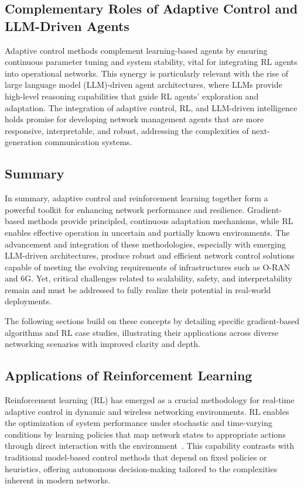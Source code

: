 \documentclass[sigconf]{acmart}
\begin{document}
\subsection{Complementary Roles of Adaptive Control and LLM-Driven Agents}

Adaptive control methods complement learning-based agents by ensuring continuous parameter tuning and system stability, vital for integrating RL agents into operational networks. This synergy is particularly relevant with the rise of large language model (LLM)-driven agent architectures, where LLMs provide high-level reasoning capabilities that guide RL agents’ exploration and adaptation. The integration of adaptive control, RL, and LLM-driven intelligence holds promise for developing network management agents that are more responsive, interpretable, and robust, addressing the complexities of next-generation communication systems.

\subsection{Summary}

In summary, adaptive control and reinforcement learning together form a powerful toolkit for enhancing network performance and resilience. Gradient-based methods provide principled, continuous adaptation mechanisms, while RL enables effective operation in uncertain and partially known environments. The advancement and integration of these methodologies, especially with emerging LLM-driven architectures, produce robust and efficient network control solutions capable of meeting the evolving requirements of infrastructures such as O-RAN and 6G. Yet, critical challenges related to scalability, safety, and interpretability remain and must be addressed to fully realize their potential in real-world deployments.

The following sections build on these concepts by detailing specific gradient-based algorithms and RL case studies, illustrating their applications across diverse networking scenarios with improved clarity and depth.

\subsection{Applications of Reinforcement Learning}

Reinforcement learning (RL) has emerged as a crucial methodology for real-time adaptive control in dynamic and wireless networking environments. RL enables the optimization of system performance under stochastic and time-varying conditions by learning policies that map network states to appropriate actions through direct interaction with the environment~\cite{ref2,ref5,ref7,ref12,ref31,ref32,ref33,ref34,ref35,ref50}. This capability contrasts with traditional model-based control methods that depend on fixed policies or heuristics, offering autonomous decision-making tailored to the complexities inherent in modern networks.
\end{document}
